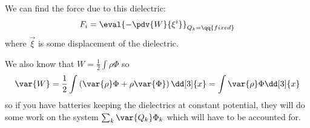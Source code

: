 \documentclass[a4paper,twoside,master.tex]{subfiles}
\begin{document}
We can find the force due to this dielectric:
\begin{equation}
    F_i = \eval{- \pdv{W}{\xi^i}}_{Q_k = \qq{fixed}}
\end{equation}
where $ \vec{\xi} $ is some displacement of the dielectric.

We also know that $ W = \frac{1}{2} \int \rho \Phi $ so
\begin{equation}
    \var{W} = \frac{1}{2} \int \left( \var{\rho} \Phi + \rho \var{\Phi} \right) \dd[3]{x} = \int \var{\rho} \Phi \dd[3]{x}
\end{equation}
so if you have batteries keeping the dielectrics at constant potential, they will do some work on the system $ \sum_{k} \var{Q_{k}} \Phi_{k} $ which will have to be accounted for.
\end{document}
